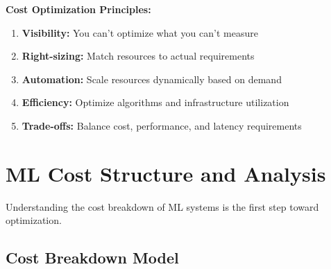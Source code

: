 \textbf{Cost Optimization Principles:}

\begin{enumerate}
    \item \textbf{Visibility:} You can't optimize what you can't measure
    \item \textbf{Right-sizing:} Match resources to actual requirements
    \item \textbf{Automation:} Scale resources dynamically based on demand
    \item \textbf{Efficiency:} Optimize algorithms and infrastructure utilization
    \item \textbf{Trade-offs:} Balance cost, performance, and latency requirements
\end{enumerate}

\section{ML Cost Structure and Analysis}

Understanding the cost breakdown of ML systems is the first step toward optimization.

\subsection{Cost Breakdown Model}

